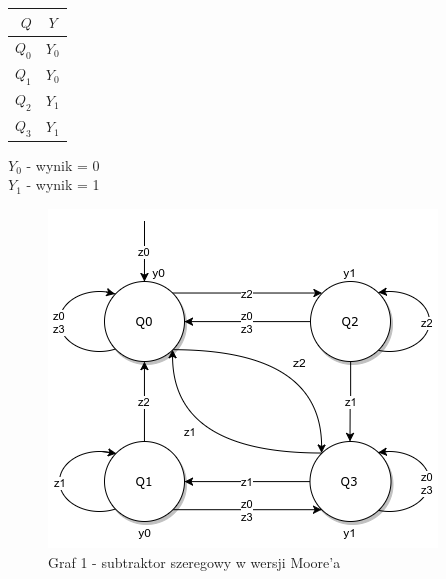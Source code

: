 \documentclass[12pt,a4paper]{article}
\begin{document}
\begin{itemize}
					\begin{minipage}{{.5\textwidth}}
						\centering
						\begin{tabular}{r|c}
							\(Q\)	&	\(Y\)	\\\hline
							\(Q_0\)	&	\(Y_0\)	\\
							\(Q_1\)	&	\(Y_0\)	\\
							\(Q_2\)	&	\(Y_1\)	\\
							\(Q_3\)	&	\(Y_1\)	\\
						\end{tabular}
					\end{minipage}%
					\begin{minipage}{{.5\textwidth}}	
						\(Y_0\) - wynik = 0\\
						\(Y_1\) - wynik = 1
					\end{minipage}
			\end{itemize}
			
			\begin{figure}[H]
				\centering
				\includegraphics[width=.5\textwidth]{schem/diag1.png}
				\\
				\vspace{.1cm}
				Graf 1 - subtraktor szeregowy w wersji Moore'a
			\end{figure}
			
			
			
\end{document}
